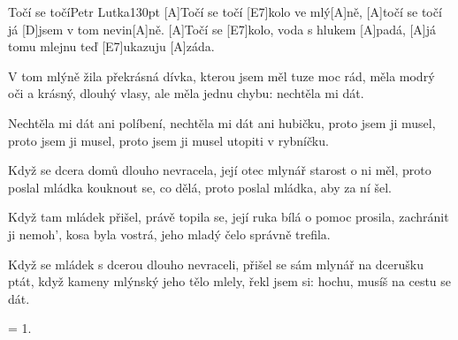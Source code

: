 \begin{song}{Točí se točí}{Petr Lutka}{130pt}
%
[A]Točí se točí [E7]kolo ve mlý[A]ně,
[A]točí se točí já [D]jsem v tom nevin[A]ně.
[A]Točí se [E7]kolo, voda s hlukem [A]padá,
[A]já tomu mlejnu teď [E7]ukazuju [A]záda.

%
V tom mlýně žila překrásná dívka, 
kterou jsem měl tuze moc rád, 
měla modrý oči a krásný, dlouhý vlasy, 
ale měla jednu chybu: nechtěla mi dát. 

%
Nechtěla mi dát ani políbení, 
nechtěla mi dát ani hubičku, 
proto jsem ji musel, proto jsem ji musel,
proto jsem ji musel utopiti v rybníčku. 

%
Když se dcera domů dlouho nevracela, 
její otec mlynář starost o ni měl, 
proto poslal mládka kouknout se, co dělá, 
proto poslal mládka, aby za ní šel. 

%
Když tam mládek přišel, právě topila se,
její ruka bílá o pomoc prosila, 
zachránit ji nemoh', kosa byla vostrá, 
jeho mladý čelo správně trefila. 

%
Když se mládek s dcerou dlouho nevraceli, 
přišel se sám mlynář na dcerušku ptát, 
když kameny mlýnský jeho tělo mlely, 
řekl jsem si: hochu, musíš na cestu se dát.

 = 1.
\end{song}
